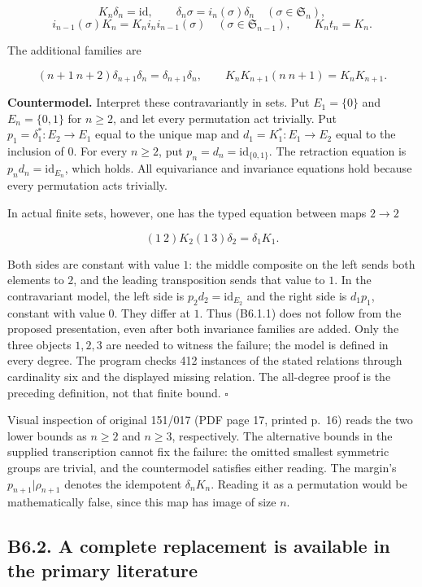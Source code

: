 \[K_n\delta_n=\mathrm{id},\qquad
\delta_n\sigma=i_n(\sigma)\delta_n\quad(\sigma\in\mathfrak S_n),\]
\[i_{n-1}(\sigma)K_n=K_n i_n i_{n-1}(\sigma)\quad(\sigma\in\mathfrak S_{n-1}),\qquad K_n t_n=K_n.\]

The additional families are

\[(n+1\ n+2)\delta_{n+1}\delta_n=\delta_{n+1}\delta_n,
\qquad K_nK_{n+1}(n\ n+1)=K_nK_{n+1}.\]

\textbf{Countermodel.} Interpret these contravariantly in sets. Put
\(E_1=\{0\}\) and \(E_n=\{0,1\}\) for \(n\ge2\), and let every
permutation act trivially. Put \(p_1=\delta_1^*:E_2\to E_1\) equal to
the unique map and \(d_1=K_1^*:E_1\to E_2\) equal to the inclusion of
\(0\). For every \(n\ge2\), put \(p_n=d_n=\mathrm{id}_{\{0,1\}}\). The
retraction equation is \(p_nd_n=\mathrm{id}_{E_n}\), which holds. All
equivariance and invariance equations hold because every permutation
acts trivially.

In actual finite sets, however, one has the typed equation between maps
\(2\to2\)

\[\boxed{(1\ 2)K_2(1\ 3)\delta_2=\delta_1K_1.}\tag{B6.1.1}\]

Both sides are constant with value \(1\): the middle composite on the
left sends both elements to \(2\), and the leading transposition sends
that value to \(1\). In the contravariant model, the left side is
\(p_2d_2=\mathrm{id}_{E_2}\) and the right side is \(d_1p_1\), constant
with value \(0\). They differ at \(1\). Thus (B6.1.1) does not follow
from the proposed presentation, even after both invariance families are
added. Only the three objects \(1,2,3\) are needed to witness the
failure; the model is defined in every degree. The program checks 412
instances of the stated relations through cardinality six and the
displayed missing relation. The all-degree proof is the preceding
definition, not that finite bound. \(\square\)

Visual inspection of original 151/017 (PDF page 17, printed p.~16)
reads the two lower bounds as \(n\ge2\) and \(n\ge3\), respectively.
The alternative bounds in the supplied transcription cannot fix the failure: the omitted smallest symmetric groups are trivial, and
the countermodel satisfies either reading. The margin's
\(p_{n+1}|\rho_{n+1}\) denotes the idempotent \(\delta_nK_n\). Reading
it as a permutation would be mathematically false, since this map has
image of size \(n\).

\subsection{B6.2. A complete replacement is available in the primary
literature}\label{b6.2.-a-complete-replacement-is-available-in-the-primary-literature}


